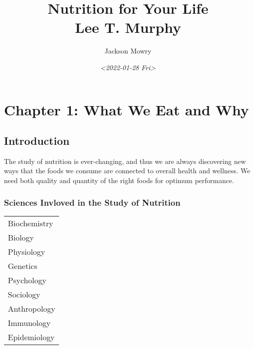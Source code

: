 \documentclass[letterpaper, 11pt]{article}
\author{Jackson Mowry}
\date{\textit{<2022-01-28 Fri>}}
\title{Nutrition for Your Life\\\medskip
\large Lee T. Murphy}
\begin{document}
\maketitle
\tableofcontents


\section{Chapter 1: What We Eat and Why}
\label{sec:org571fa6b}
\subsection{Introduction}
\label{sec:org37a08a4}
The study of nutrition is ever-changing, and thus we are always discovering new ways that the foods we consume are connected to overall health and wellness. We need both quality and quantity of the right foods for optimum performance.\\
\subsubsection{Sciences Invloved in the Study of Nutrition}
\label{sec:org148b99f}
\begin{center}
\begin{tabular}{l}
Biochemistry\\
Biology\\
Physiology\\
Genetics\\
Psychology\\
Sociology\\
Anthropology\\
Immunology\\
Epidemiology\\
\end{tabular}
\end{center}
\end{document}

